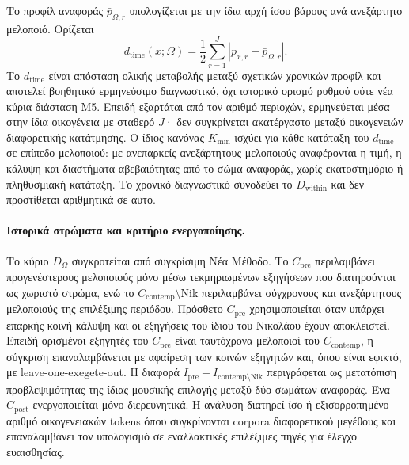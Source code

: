 \documentclass[11pt,a4paper]{article}
\begin{document}
Το προφίλ αναφοράς $\bar p_{\Omega,r}$ υπολογίζεται με την ίδια αρχή ίσου βάρους ανά ανεξάρτητο μελοποιό. Ορίζεται
\[
d_{\mathrm{time}}(x;\Omega)=
\frac12\sum_{r=1}^{J}\left|p_{x,r}-\bar p_{\Omega,r}\right|.
\]
Το $d_{\mathrm{time}}$ είναι απόσταση ολικής μεταβολής μεταξύ σχετικών χρονικών προφίλ και αποτελεί βοηθητικό ερμηνεύσιμο διαγνωστικό, όχι ιστορικό ορισμό ρυθμού ούτε νέα κύρια διάσταση M5. Επειδή εξαρτάται από τον αριθμό περιοχών, ερμηνεύεται μέσα στην ίδια οικογένεια με σταθερό $J$· δεν συγκρίνεται ακατέργαστο μεταξύ οικογενειών διαφορετικής κατάτμησης. Ο ίδιος κανόνας $K_{\min}$ ισχύει για κάθε κατάταξη του $d_{\mathrm{time}}$ σε επίπεδο μελοποιού: με ανεπαρκείς ανεξάρτητους μελοποιούς αναφέρονται η τιμή, η κάλυψη και διαστήματα αβεβαιότητας από το σώμα αναφοράς, χωρίς εκατοστημόριο ή πληθυσμιακή κατάταξη. Το χρονικό διαγνωστικό συνοδεύει το $D_{\mathrm{within}}$ και δεν προστίθεται αριθμητικά σε αυτό.

\paragraph{Ιστορικά στρώματα και κριτήριο ενεργοποίησης.}
Το κύριο $D_{\Omega}$ συγκροτείται από συγκρίσιμη Νέα Μέθοδο. Το $C_{\mathrm{pre}}$ περιλαμβάνει προγενέστερους μελοποιούς μόνο μέσω τεκμηριωμένων εξηγήσεων που διατηρούνται ως χωριστό στρώμα, ενώ το $C_{\mathrm{contemp}}\setminus \mathrm{Nik}$ περιλαμβάνει σύγχρονους και ανεξάρτητους μελοποιούς της επιλέξιμης περιόδου. Πρόσθετο $C_{\mathrm{pre}}$ χρησιμοποιείται όταν υπάρχει επαρκής κοινή κάλυψη και οι εξηγήσεις του ίδιου του Νικολάου έχουν αποκλειστεί. Επειδή ορισμένοι εξηγητές του $C_{\mathrm{pre}}$ είναι ταυτόχρονα μελοποιοί του $C_{\mathrm{contemp}}$, η σύγκριση επαναλαμβάνεται με αφαίρεση των κοινών εξηγητών και, όπου είναι εφικτό, με leave-one-exegete-out. Η διαφορά $I_{\mathrm{pre}}-I_{\mathrm{contemp}\setminus \mathrm{Nik}}$ περιγράφεται ως μετατόπιση προβλεψιμότητας της ίδιας μουσικής επιλογής μεταξύ δύο σωμάτων αναφοράς. Ένα $C_{\mathrm{post}}$ ενεργοποιείται μόνο διερευνητικά. Η ανάλυση διατηρεί ίσο ή εξισορροπημένο αριθμό οικογενειακών tokens όπου συγκρίνονται corpora διαφορετικού μεγέθους και επαναλαμβάνει τον υπολογισμό σε εναλλακτικές επιλέξιμες πηγές για έλεγχο ευαισθησίας.
\end{document}
